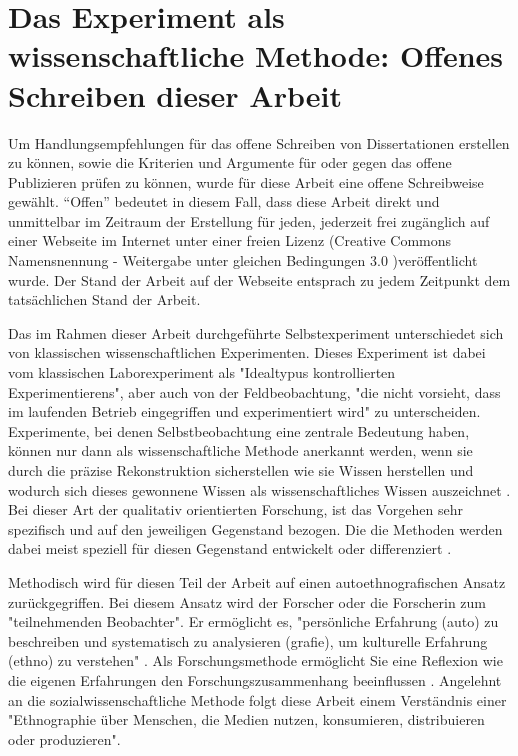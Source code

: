 \section{Das Experiment als wissenschaftliche Methode: Offenes Schreiben dieser Arbeit}

Um Handlungsempfehlungen für das offene Schreiben von Dissertationen erstellen zu können, sowie die Kriterien und Argumente für oder gegen das offene Publizieren prüfen zu können, wurde für diese Arbeit eine offene Schreibweise gewählt. “Offen” bedeutet in diesem Fall, dass diese Arbeit direkt und unmittelbar im Zeitraum der Erstellung für jeden, jederzeit frei zugänglich auf einer Webseite im Internet unter einer freien Lizenz (Creative Commons Namensnennung - Weitergabe unter gleichen Bedingungen 3.0 \cite{cc_by_sa_2008})veröffentlicht wurde. Der Stand der Arbeit auf der Webseite entsprach zu jedem Zeitpunkt dem tatsächlichen Stand der Arbeit.

Das im Rahmen dieser Arbeit durchgeführte Selbstexperiment unterschiedet sich von klassischen wissenschaftlichen Experimenten. Dieses Experiment ist dabei vom klassischen Laborexperiment als "Idealtypus kontrollierten Experimentierens", aber auch von der Feldbeobachtung, "die nicht vorsieht, dass im laufenden Betrieb eingegriffen und experimentiert wird" \cite{FQS196} zu unterscheiden. Experimente, bei denen Selbstbeobachtung eine zentrale Bedeutung haben, können nur dann als wissenschaftliche Methode anerkannt werden, wenn sie durch die präzise Rekonstruktion sicherstellen wie sie Wissen herstellen und wodurch sich dieses gewonnene Wissen als wissenschaftliches Wissen auszeichnet \cite{solhdju_2011_selbstexperimente}. Bei dieser Art der qualitativ orientierten Forschung, ist das Vorgehen sehr spezifisch und auf den jeweiligen Gegenstand bezogen. Die die Methoden werden dabei meist speziell für diesen Gegenstand entwickelt oder differenziert \cite{Mayring_1999:119}.

Methodisch wird für diesen Teil der Arbeit auf einen autoethnografischen Ansatz zurückgegriffen. Bei diesem Ansatz wird der Forscher oder die Forscherin zum "teilnehmenden Beobachter"\cite{Ellis_2010}. Er ermöglicht es, "persönliche Erfahrung (auto) zu beschreiben und systematisch zu analysieren (grafie), um kulturelle Erfahrung (ethno) zu verstehen" \cite{Ellis_2010}. Als Forschungsmethode ermöglicht Sie eine Reflexion wie die eigenen Erfahrungen den Forschungszusammenhang beeinflussen \cite{ellis_2011_autoethnography}. Angelehnt an die sozialwissenschaftliche Methode folgt diese Arbeit einem Verständnis einer "Ethnographie über Menschen, die Medien nutzen, konsumieren, distribuieren oder produzieren"\cite{bachmann_2011_ethnographie}.

